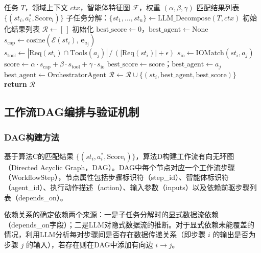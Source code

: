 \begin{algorithm}[H]
\caption{子任务-智能体混合匹配算法（算法C）}
\label{alg:matching}
\begin{algorithmic}[1]
\Require 任务 $T$，领域上下文 $ctx$，智能体特征图 $\mathcal{F}$，权重 $(\alpha, \beta, \gamma)$
\Ensure 匹配结果列表 $\{(st_i, a_i^*, \mathrm{Score}_i)\}$
\State 子任务分解：$\{st_1, \ldots, st_n\} \gets \mathrm{LLM\_Decompose}(T, ctx)$
\State 初始化结果列表 $\mathcal{R} \gets [\,]$
    \State 初始化 $\mathrm{best\_score} \gets 0$，$\mathrm{best\_agent} \gets \mathrm{None}$
        \State $s_{\mathrm{cap}} \gets \mathrm{cosine}(\mathcal{E}(st_i),\, \mathbf{e}_{a_j})$
        \State $s_{\mathrm{tool}} \gets |\mathrm{Req}(st_i) \cap \mathrm{Tools}(a_j)|\,/\,(|\mathrm{Req}(st_i)| + \epsilon)$
        \State $s_{\mathrm{io}} \gets \mathrm{IOMatch}(st_i, a_j)$
        \State $\mathrm{score} \gets \alpha \cdot s_{\mathrm{cap}} + \beta \cdot s_{\mathrm{tool}} + \gamma \cdot s_{\mathrm{io}}$
            \State $\mathrm{best\_score} \gets \mathrm{score}$；$\mathrm{best\_agent} \gets a_j$
        \EndIf
    \EndFor
        \State $\mathrm{best\_agent} \gets \mathrm{OrchestratorAgent}$
    \EndIf
    \State $\mathcal{R} \gets \mathcal{R} \cup \{(st_i, \mathrm{best\_agent}, \mathrm{best\_score})\}$
\EndFor
\State \textbf{return} $\mathcal{R}$
\end{algorithmic}
\end{algorithm}

\subsection{工作流DAG编排与验证机制}

\subsubsection{DAG构建方法}

基于算法C的匹配结果 $\{(st_i, a_i^*, \text{Score}_i)\}$，算法D构建工作流有向无环图（Directed Acyclic Graph，DAG）。DAG中每个节点对应一个工作流步骤（WorkflowStep），节点属性包括步骤标识符（step\_id）、智能体标识符（agent\_id）、执行动作描述（action）、输入参数（inputs）以及依赖前驱步骤列表（depends\_on）。

依赖关系的确定依赖两个来源：一是子任务分解时的显式数据流依赖（depends\_on字段）；二是LLM对隐式数据流的推断。对于显式依赖未能覆盖的情况，利用LLM分析每对步骤间是否存在数据传递关系（即步骤 $i$ 的输出是否为步骤 $j$ 的输入），若存在则在DAG中添加有向边 $i \rightarrow j$。

